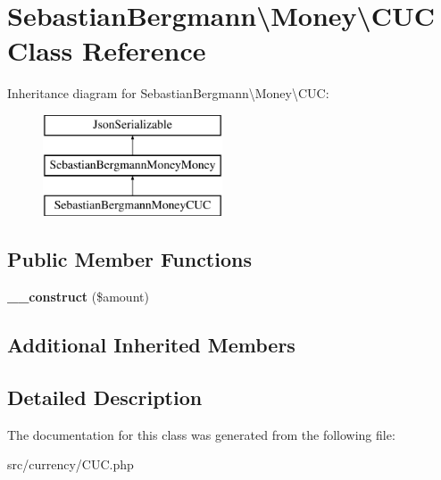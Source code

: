\hypertarget{classSebastianBergmann_1_1Money_1_1CUC}{}\section{Sebastian\+Bergmann\textbackslash{}Money\textbackslash{}C\+U\+C Class Reference}
\label{classSebastianBergmann_1_1Money_1_1CUC}
Inheritance diagram for Sebastian\+Bergmann\textbackslash{}Money\textbackslash{}C\+U\+C\+:\begin{figure}[H]
\begin{center}
\leavevmode
\includegraphics[height=3.000000cm]{classSebastianBergmann_1_1Money_1_1CUC}
\end{center}
\end{figure}
\subsection*{Public Member Functions}
\begin{DoxyCompactItemize}
\item 
\hypertarget{classSebastianBergmann_1_1Money_1_1CUC_a882504b6157b913ca47e69756604a081}{}{\bfseries \+\_\+\+\_\+construct} (\$amount)\label{classSebastianBergmann_1_1Money_1_1CUC_a882504b6157b913ca47e69756604a081}

\end{DoxyCompactItemize}
\subsection*{Additional Inherited Members}


\subsection{Detailed Description}


The documentation for this class was generated from the following file\+:\begin{DoxyCompactItemize}
\item 
src/currency/C\+U\+C.\+php\end{DoxyCompactItemize}
